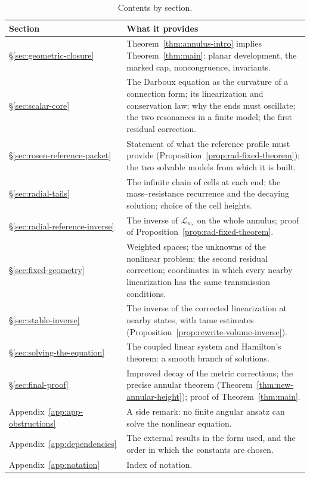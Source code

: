 \begin{table}[htbp]
\centering
\begin{tabularx}{\linewidth}{@{}l Y@{}}
\toprule
Section & What it provides\\
\midrule
\S\ref{sec:geometric-closure} &
 Theorem~\ref{thm:annulus-intro} implies Theorem~\ref{thm:main}:
 planar development, the marked cap, noncongruence, invariants.\\
\S\ref{sec:scalar-core} &
 The Darboux equation as the curvature of a connection form; its
 linearization and conservation law; why the ends must oscillate; the
 two resonances in a finite model; the first residual correction.\\
\S\ref{sec:rosen-reference-packet} &
 Statement of what the reference profile must provide
 (Proposition~\ref{prop:rad-fixed-theorem}); the two solvable models
 from which it is built.\\
\S\ref{sec:radial-tails} &
 The infinite chain of cells at each end; the mass--resistance
 recurrence and the decaying solution; choice of the cell heights.\\
\S\ref{sec:radial-reference-inverse} &
 The inverse of $\mathscr L_{w_*}$ on the whole annulus; proof of
 Proposition~\ref{prop:rad-fixed-theorem}.\\
\S\ref{sec:fixed-geometry} &
 Weighted spaces; the unknowns of the nonlinear problem; the second
 residual correction; coordinates in which every nearby linearization
 has the same transmission conditions.\\
\S\ref{sec:stable-inverse} &
 The inverse of the corrected linearization at nearby states, with tame
 estimates (Proposition~\ref{prop:rewrite-volume-inverse}).\\
\S\ref{sec:solving-the-equation} &
 The coupled linear system and Hamilton's theorem: a smooth branch of
 solutions.\\
\S\ref{sec:final-proof} &
 Improved decay of the metric corrections; the precise annular theorem
 (Theorem~\ref{thm:new-annular-height}); proof of
 Theorem~\ref{thm:main}.\\
Appendix~\ref{app:app-obstructions} &
 A side remark: no finite angular ansatz can solve the nonlinear
 equation.\\
Appendix~\ref{app:dependencies} &
 The external results in the form used, and the order in which the
 constants are chosen.\\
Appendix~\ref{app:notation} & Index of notation.\\
\bottomrule
\end{tabularx}
\caption{Contents by section.}
\label{tab:sections}
\end{table}

